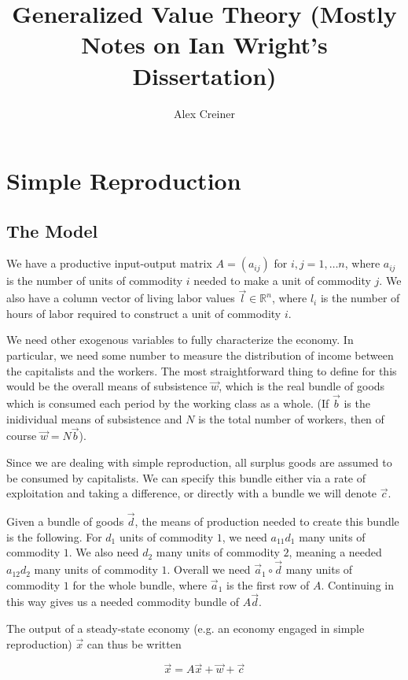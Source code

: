 \documentclass{article}
\title{Generalized Value Theory (Mostly Notes on Ian Wright's Dissertation)}
\author{Alex Creiner}
\theoremstyle{definition}
\begin{document}
\maketitle
\section{Simple Reproduction}

\subsection{The Model}

We have a productive input-output matrix $A = (a_{ij})$ for $i,j=1,\ldots n$, where $a_{ij}$ is the number of units of commodity $i$ needed to make a unit of commodity $j$. We also have a column vector of living labor values $\vec{l} \in \mathbb{R}^n$, where $l_{i}$ is the number of hours of labor required to construct a unit of commodity $i$. 

We need other exogenous variables to fully characterize the economy. In particular, we need some number to measure the distribution of income between the capitalists and the workers. The most straightforward thing to define for this would be the overall means of subsistence $\vec{w}$, which is the real bundle of goods which is consumed each period by the working class as a whole. (If $\vec{b}$ is the inidividual means of subsistence and $N$ is the total number of workers, then of course $\vec{w}= N\vec{b}$). 

Since we are dealing with simple reproduction, all surplus goods are assumed to be consumed by capitalists. We can specify this bundle either via a rate of exploitation and taking a difference, or directly with a bundle we will denote $\vec{c}$. 

Given a bundle of goods $\vec{d}$, the means of production needed to create this bundle is the following. For $d_1$ units of commodity $1$, we need $a_{11}d_1$ many units of commodity $1$. We also need $d_2$ many units of commodity $2$, meaning a needed $a_{12}d_2$ many units of commodity $1$. Overall we need $\vec{a}_1\circ \vec{d}$ many units of commodity $1$ for the whole bundle, where $\vec{a}_1$ is the first row of $A$. Continuing in this way gives us a needed commodity bundle of $A\vec{d}$. 

The output of a steady-state economy (e.g. an economy engaged in simple reproduction) $\vec{x}$ can thus be written 

\begin{equation}
    \vec{x} = A\vec{x}+\vec{w}+\vec{c}
\end{equation}
\end{document}
